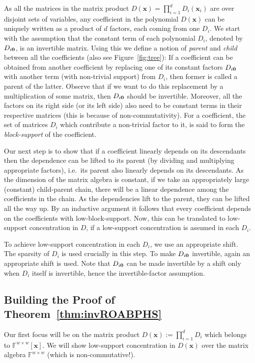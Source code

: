 \documentclass[final,oneeqnum, onethmnum, onefignum]{siamltex1213}
\newcommand{\F}{\mathbb F}
\renewcommand{\o}[1]{\overline{#1}}
\begin{document}
As all the matrices in the matrix product $D(\mathbf{x}) = \prod_{i=1}^{d} D_i(\mathbf{x}_i)$
are over disjoint sets of variables,
any coefficient in the polynomial $D(\mathbf{x})$ can be uniquely written as a product of 
$d$ factors, each coming from one $D_i$. 
We start with the assumption that the constant term of each polynomial $D_i$, 
denoted by $D_{i {\bf 0}}$, is an invertible matrix.
Using this we define a notion of {\em parent} and {\em child}
between all the coefficients (also see Figure~\ref{fig:tree}): 
If a coefficient can be obtained
from another coefficient by replacing one of its constant factors $D_{i {\bf 0}}$
with another term (with non-trivial support) from $D_i$, 
then former is called a parent
of the latter. 
Observe that if we want to do this replacement by a multiplication of some matrix, 
then $D_{i {\bf 0}}$ should be invertible.
Moreover, all the factors on its right side (or its left side) 
also need to be
constant terms in their respective matrices (this is because of non-commutativity).
For a coefficient, the set of matrices $D_i$ which contribute a non-trivial
factor to it, is said to form the {\em block-support} of the coefficient.

Our next step is to show that if a coefficient linearly depends on its descendants 
then the dependence can be lifted to its parent (by dividing and multiplying appropriate factors), i.e.\ its parent also linearly depends 
on its descendants. 
As the dimension of the matrix algebra is constant, 
if we take an appropriately large (constant) child-parent chain,
there will be a linear dependence among the coefficients in the chain.
As the dependencies lift to the parent, they can be lifted all the way up. 
By an inductive argument it follows that every coefficient depends on 
the coefficients with low-block-support. 
Now, this can be translated to low-support concentration in $D$,
if a low-support concentration is assumed in each $D_i$. 

To achieve low-support concentration in each $D_i$,
we use an appropriate shift. The sparsity of $D_i$ is used crucially 
in this step. 
To make $D_{i {\bf 0}}$ invertible, again an appropriate shift is used. 
Note that $D_{i {\bf 0}}$ can be made invertible by a shift only when 
$D_i$ itself is invertible, hence the invertible-factor assumption. 


\subsection{Building the Proof of Theorem~\ref{thm:invROABPHS}}
\label{sec:proofinvROABP}
Our first focus will be on
the matrix product $D(\mathbf{x}) := \prod_{i=1}^{d} D_i$
which belongs to $\F^{w \times w}[\mathbf{x}]$. 
We will show low-support concentration in $D(\mathbf{x})$
over the matrix algebra $\F^{w \times w}$ (which is non-commutative!).
\end{document}
